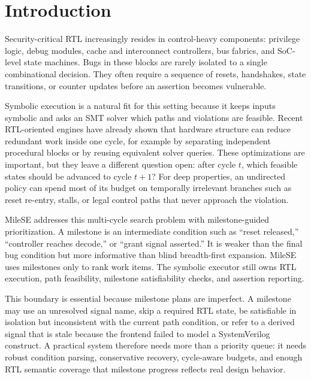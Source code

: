 \documentclass[conference]{IEEEtran}
\begin{document}
\section{Introduction}
\label{sec:intro}
Security-critical RTL increasingly resides in control-heavy components: privilege logic, debug modules, cache and interconnect controllers, bus fabrics, and SoC-level state machines. Bugs in these blocks are rarely isolated to a single combinational decision. They often require a sequence of resets, handshakes, state transitions, or counter updates before an assertion becomes vulnerable.

Symbolic execution is a natural fit for this setting because it keeps inputs symbolic and asks an SMT solver which paths and violations are feasible. Recent RTL-oriented engines have already shown that hardware structure can reduce redundant work inside one cycle, for example by separating independent procedural blocks or by reusing equivalent solver queries. These optimizations are important, but they leave a different question open: after cycle $t$, which feasible states should be advanced to cycle $t+1$? For deep properties, an undirected policy can spend most of its budget on temporally irrelevant branches such as reset re-entry, stalls, or legal control paths that never approach the violation.

MileSE addresses this multi-cycle search problem with milestone-guided prioritization. A milestone is an intermediate condition such as ``reset released,'' ``controller reaches decode,'' or ``grant signal asserted.'' It is weaker than the final bug condition but more informative than blind breadth-first expansion. MileSE uses milestones only to rank work items. The symbolic executor still owns RTL execution, path feasibility, milestone satisfiability checks, and assertion reporting.

This boundary is essential because milestone plans are imperfect. A milestone may use an unresolved signal name, skip a required RTL state, be satisfiable in isolation but inconsistent with the current path condition, or refer to a derived signal that is stale because the frontend failed to model a SystemVerilog construct. A practical system therefore needs more than a priority queue: it needs robust condition parsing, conservative recovery, cycle-aware budgets, and enough RTL semantic coverage that milestone progress reflects real design behavior.
\end{document}
